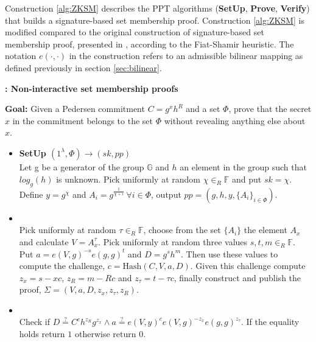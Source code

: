 Construction \ref{alg:ZKSM} describes the  PPT algorithms (\textbf{SetUp}, \textbf{Prove}, \textbf{Verify}) that builds a signature-based set membership proof. Construction \ref{alg:ZKSM} is modified compared to the original construction of signature-based set membership proof, presented in \cite{RANGE-SET}, according to the Fiat-Shamir heuristic. The notation $e(\cdot,\cdot)$ in the construction refers to an admissible bilinear mapping as defined previously in section \ref{sec:bilinear}.
\begin{algorithm}[]
\caption{\textbf{: Non-interactive set membership proofs}}
\textbf{Goal:} Given a Pedersen commitment $C=g^x h^R$ and a set $\Phi$, prove that the secret $x$ in the commitment belongs to the set $\Phi$ without revealing anything else about $x$.
\vspace{2pt} \hline \vspace{2pt}
\begin{itemize}
  \item\textbf{SetUp $(1^{\lambda}, \Phi)\xrightarrow[]{}(sk,pp)$}\\
 Let g be a generator of the group $\mathds{G}$ and $h$ an element in the group such that $log_g(h)$ is unknown.  
Pick uniformly at random $\chi\in_R\mathds{F}$ and put $sk=\chi$. Define $y=g^\chi$ and $A_i=g^{\frac{1}{\chi+i}} \:\forall i\in\Phi$, output $pp=(g,h,y,\{A_i\}_{i\in\Phi})$.

\item{}\\
Pick uniformly at random $\tau\in_R\mathds{F}$, choose from the set $\{A_i\}$ the element $A_x$ and calculate $V=A_x^\tau$. Pick uniformly at random three values $s,t,m\in_R\mathds{F}$. Put $a=e(V,g)^{-s}e(g,g)^t$ and $D=g^sh^m$. Then use these values to compute the challenge, $c=\text{Hash}(C,V,a,D)$. Given this challenge compute $z_x = s-x c$, $z_R = m-Rc$ and $z_\tau= t-\tau c$, finally construct and publish the proof, $\Sigma = (V,a,D,z_x,z_\tau,z_R)$.

\item{}\\
Check if $D\overset{?}{=}C^ch^{z_R}g^{z_x}\wedge a \overset{?}{=} e(V,y)^c e(V,g)^{-z_x}e(g,g)^{z_\tau}$. If the equality holds return $1$ otherwise return $0$.
\end{itemize}
\label{alg:ZKSM}
\end{algorithm}

